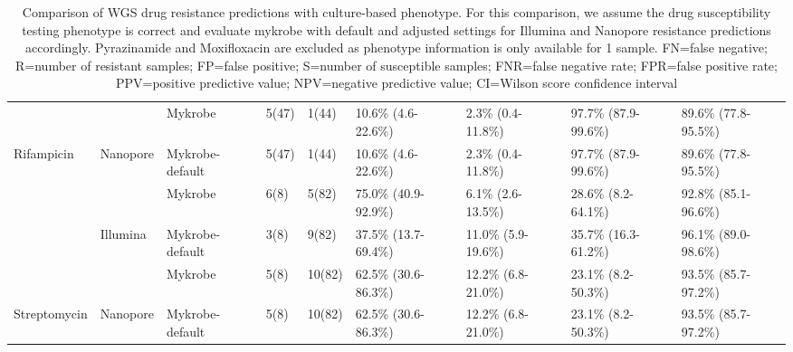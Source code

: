 \begin{table}
{\begin{tabular}{|l|l|l|l|l|l|l|l|l|}
 &
   &
  Mykrobe &
  5(47) &
  1(44) &
  10.6\% (4.6-22.6\%) &
  2.3\% (0.4-11.8\%) &
  97.7\% (87.9-99.6\%) &
  89.6\% (77.8-95.5\%) \\ \cline{3-9} 
\multirow{-4}{*}{Rifampicin} &
  \multirow{-2}{*}{Nanopore} &
  \cellcolor[HTML]{EFEFEF}Mykrobe-default &
  \cellcolor[HTML]{EFEFEF}5(47) &
  \cellcolor[HTML]{EFEFEF}1(44) &
  \cellcolor[HTML]{EFEFEF}10.6\% (4.6-22.6\%) &
  \cellcolor[HTML]{EFEFEF}2.3\% (0.4-11.8\%) &
  \cellcolor[HTML]{EFEFEF}97.7\% (87.9-99.6\%) &
  \cellcolor[HTML]{EFEFEF}89.6\% (77.8-95.5\%) \\ \hline
 &
   &
  Mykrobe &
  6(8) &
  5(82) &
  75.0\% (40.9-92.9\%) &
  6.1\% (2.6-13.5\%) &
  28.6\% (8.2-64.1\%) &
  92.8\% (85.1-96.6\%) \\ \cline{3-9} 
 &
  \multirow{-2}{*}{Illumina} &
  \cellcolor[HTML]{EFEFEF}Mykrobe-default &
  \cellcolor[HTML]{EFEFEF}3(8) &
  \cellcolor[HTML]{EFEFEF}9(82) &
  \cellcolor[HTML]{EFEFEF}37.5\% (13.7-69.4\%) &
  \cellcolor[HTML]{EFEFEF}11.0\% (5.9-19.6\%) &
  \cellcolor[HTML]{EFEFEF}35.7\% (16.3-61.2\%) &
  \cellcolor[HTML]{EFEFEF}96.1\% (89.0-98.6\%) \\ \cline{2-9} 
 &
   &
  Mykrobe &
  5(8) &
  10(82) &
  62.5\% (30.6-86.3\%) &
  12.2\% (6.8-21.0\%) &
  23.1\% (8.2-50.3\%) &
  93.5\% (85.7-97.2\%) \\ \cline{3-9} 
\multirow{-4}{*}{Streptomycin} &
  \multirow{-2}{*}{Nanopore} &
  \cellcolor[HTML]{EFEFEF}Mykrobe-default &
  \cellcolor[HTML]{EFEFEF}5(8) &
  \cellcolor[HTML]{EFEFEF}10(82) &
  \cellcolor[HTML]{EFEFEF}62.5\% (30.6-86.3\%) &
  \cellcolor[HTML]{EFEFEF}12.2\% (6.8-21.0\%) &
  \cellcolor[HTML]{EFEFEF}23.1\% (8.2-50.3\%) &
  \cellcolor[HTML]{EFEFEF}93.5\% (85.7-97.2\%) \\ \hline
\end{tabular}%
}
\caption{Comparison of WGS drug resistance predictions with culture-based phenotype. For this comparison, we assume the drug susceptibility testing phenotype is correct and evaluate mykrobe with default and adjusted settings for Illumina and Nanopore resistance predictions accordingly. Pyrazinamide and Moxifloxacin are excluded as phenotype information is only available for 1 sample. FN=false negative; R=number of resistant samples; FP=false positive; S=number of susceptible samples; FNR=false negative rate; FPR=false positive rate; PPV=positive predictive value; NPV=negative predictive value; CI=Wilson score confidence interval}
\label{tab:mykrobe-settings-pheno}
\end{table}


